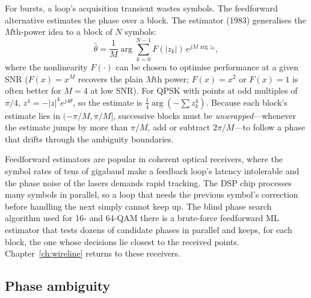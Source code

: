 For bursts, a loop's acquisition transient wastes symbols. The feedforward alternative estimates
the phase over a block. The  estimator (1983) generalises the $M$th-power
idea to a block of $N$ symbols:
\begin{equation}
\hat\theta=\frac1M\arg\sum_{k=0}^{N-1}F(|z_k|)\,e^{jM\arg z_k},
\end{equation}
where the nonlinearity $F(\cdot)$ can be chosen to optimise performance at a given SNR ($F(x)=x^M$
recovers the plain $M$th power; $F(x)=x^2$ or $F(x)=1$ is often better for $M=4$ at low SNR). For
QPSK with points at odd multiples of $\pi/4$, $z^4=-|z|^4e^{j4\theta}$, so the estimate is
$\tfrac14\arg(-\sum z_k^4)$. Because each block's estimate lies in $(-\pi/M,\pi/M]$, successive blocks
must be \emph{unwrapped}---whenever the estimate jumps by more than $\pi/M$, add or subtract $2\pi/M$---to
follow a phase that drifts through the ambiguity boundaries.

\begin{inpractice}
Feedforward estimators are popular in coherent optical receivers, where the symbol rates of tens
of gigabaud make a feedback loop's latency intolerable and the phase noise of the lasers demands
rapid tracking. The DSP chip processes many symbols in parallel, so a loop that needs the previous
symbol's correction before handling the next simply cannot keep up. The blind phase search
algorithm used for 16- and 64-QAM there is a brute-force feedforward ML estimator that tests dozens
of candidate phases in parallel and keeps, for each block, the one whose decisions lie closest to
the received points. Chapter~\ref{ch:wireline} returns to these receivers.
\end{inpractice}

\subsection{Phase ambiguity}

